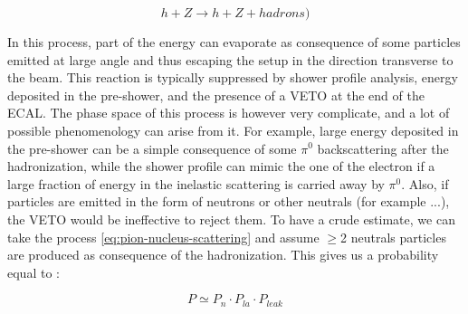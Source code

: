 \begin{equation}
  \label{eq:pion-nucleus-scattering}
  h + Z \longrightarrow h + Z + hadrons)
\end{equation}

In this process, part of the energy can evaporate as consequence of some particles emitted at large angle and thus escaping the setup in the direction transverse to the beam. This reaction is typically suppressed by shower profile analysis, energy deposited in the pre-shower, and the presence of a VETO at the end of the ECAL. The phase space of this process is however very complicate, and a lot of possible phenomenology can arise from it. For example, large energy deposited in the pre-shower can be a simple consequence of some $\pi^0$ backscattering after the hadronization, while the shower profile can mimic the one of the electron if a large fraction of energy in the inelastic scattering is carried away by $\pi^0$. Also, if particles are emitted in the form of neutrons or other neutrals (for example ...), the VETO would be ineffective to reject them. To have a crude estimate, we can take the process \ref{eq:pion-nucleus-scattering} and assume $\geq$2 neutrals particles are produced as consequence of the hadronization. This gives us a probability equal to \cite{gkkk1}:

\begin{equation}
  \label{eq:transverse-leak-estimate}
  P \simeq P_n \cdot P_{la} \cdot P_{leak}
\end{equation}

